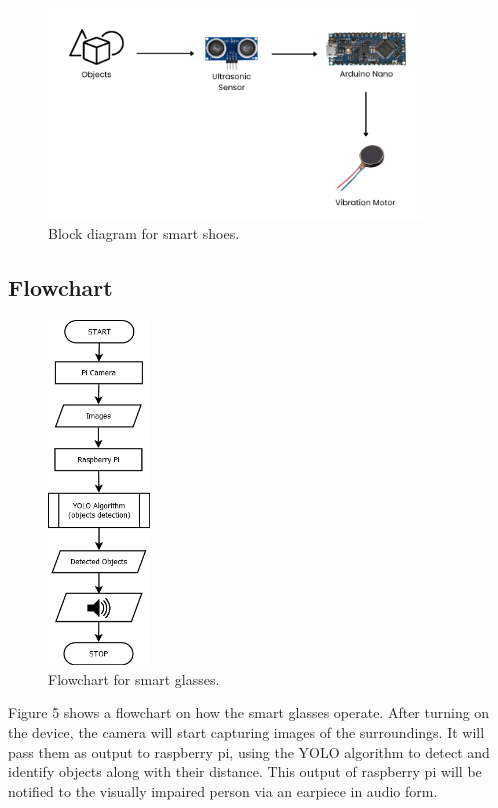 \documentclass[conference]{IEEEtran}
\begin{document}
\begin{figure}[h]
\centering
\includegraphics[width=3.3in\textwidth, height=2.2in]{block_lower_300_DPI.png}
\caption{Block diagram for smart shoes.}
\label{fig_sim}
\end{figure}

\subsection{Flowchart}

\begin{figure}[h]
\centering
\includegraphics[width=1.4in\textwidth, height=3.6in]{flowchart_upper_300_DPI.png}
\caption{Flowchart for smart glasses.}
\label{fig_sim}
\end{figure}

Figure 5 shows a flowchart on how the smart glasses operate. After turning on the device, the camera will start capturing images of the surroundings. It will pass them as output to raspberry pi, using the YOLO algorithm to detect and identify objects along with their distance. This output of raspberry pi will be notified to the visually impaired person via an earpiece in audio form.
\end{document}
